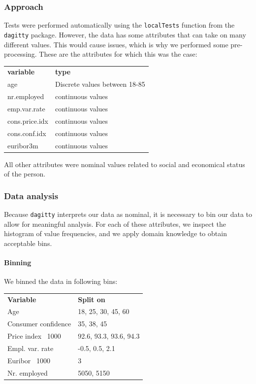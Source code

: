 \documentclass[11pt,]{article}
\let\oldparagraph\paragraph
\renewcommand{\paragraph}[1]{\oldparagraph{#1}\mbox{}}
\begin{document}
\begin{multicols}{2}
\hypertarget{approach}{%
\subsubsection{Approach}\label{approach}}

Tests were performed automatically using the \texttt{localTests}
function from the \texttt{dagitty} package. However, the data has some
attributes that can take on many different values. This would cause
issues, which is why we performed some pre-processing. These are the
attributes for which this was the case:

\medskip
\begin{tabular}{ll}
    \textbf{variable} & \textbf{type} \\
    age & Discrete values between 18-85 \\
    nr.employed & continuous values \\
    emp.var.rate & continuous values \\
    cons.price.idx & continuous values \\
    cons.conf.idx & continuous values \\
    euribor3m & continuous values \\
\end{tabular}

\medskip

All other attributes were nominal values related to social and
economical status of the person.

\hypertarget{data-analysis}{%
\subsubsection{Data analysis}\label{data-analysis}}

Because \texttt{dagitty} interprets our data as nominal, it is necessary
to bin our data to allow for meaningful analysis. For each of these
attributes, we inspect the histogram of value frequencies, and we apply
domain knowledge to obtain acceptable bins.

\hypertarget{binning}{%
\paragraph{Binning}\label{binning}}

We binned the data in following bins:

\medskip
\begin{tabular}{ll}
    \textbf{Variable}           & \textbf{Split on} \\
    Age                         & 18, 25, 30, 45, 60 \\
    Consumer confidence         & 35, 38, 45 \\
    Price index \ 1000          & 92.6, 93.3, 93.6, 94.3 \\
    Empl. var. rate             & -0.5, 0.5, 2.1 \\
    Euribor \ 1000              & 3 \\
    Nr. employed                & 5050, 5150 \\
\end{tabular}


\end{multicols}
\end{document}
